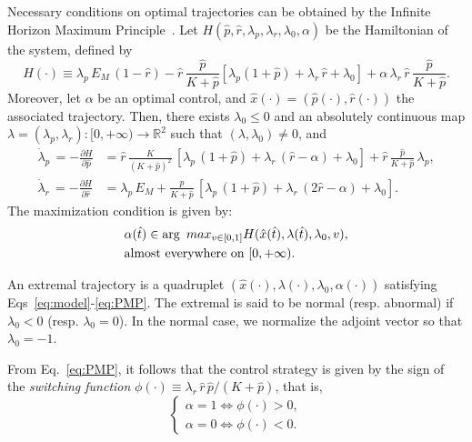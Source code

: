 Necessary conditions on optimal trajectories can be obtained by the Infinite Horizon Maximum Principle~\cite{carlson_infinite_1991}.
Let $H(\hat{p},\hat{r},\lambda_p,\lambda_r,\lambda_0,\alpha)$ be the Hamiltonian of the system, defined by
\[
H(\cdot) \equiv \lambda_p\, E_M\, (1-\hat{r}) - \hat{r}\, \dfrac{\hat{p}}{K+\hat{p}}\left[\lambda_p (1+\hat{p}) +\lambda_r\, \hat{r} +\lambda_0\right] + \alpha \, \lambda_r \, \hat{r}\, \frac{\hat{p}}{K+\hat{p}}.
\]
Moreover, let $\alpha$ be an optimal control, and $\hat{x}(\cdot)=(\hat{p}(\cdot),\hat{r}(\cdot))$ the associated trajectory.
Then, there exists $\lambda_0 \leq 0$ and an absolutely continuous map $\lambda=(\lambda_p,\lambda_r):[0,+\infty) \rightarrow \mathbb{R}^2$
such that $(\lambda,\lambda_0)\neq0$, and
\begin{align}
\dot{\lambda}_p\, =-\frac{\partial H}{\partial \hat p}&= \hat{r} \, \frac{K}{(K+\hat{p})^2}\, \left[\lambda_p \, (1+\hat{p}) +\lambda_r\, ( \hat{r}-\alpha) + \lambda_0\right] + \hat{r}\, \frac{\hat{p}}{K+\hat{p}}\, \lambda_p, \label{eq:adjoint_p}\\
 \dot{\lambda}_r\, =-\frac{\partial H}{\partial \hat r}&= \lambda_p\, E_M +\frac{\hat{p}}{K+\hat{p}} \, \left[\lambda_p \, (1+\hat{p}) +\lambda_r\, (2 \hat{r}-\alpha) +\lambda_0\right] \label{eq:adjoint_r}.
\end{align}
The maximization condition is given by:
\begin{equation}{\label{eq:PMP}}
\begin{aligned}
&\alpha(\hat{t}) \in \arg\ max_{v \in [0,1]} H(\hat{x}(\hat{t}),\lambda(\hat{t}),\lambda_0,v), \\ &\mathrm{almost}\ \mathrm{everywhere}\ \mathrm{on}\ [0,+\infty).
\end{aligned}
\end{equation}

An extremal trajectory is a quadruplet $(\hat{x}(\cdot),\lambda(\cdot),\lambda_0,\alpha(\cdot))$ satisfying Eqs~\ref{eq:model}-\ref{eq:PMP}. The extremal is said to be normal (resp. abnormal) if $\lambda_0<0$ (resp. $\lambda_0=0$). In the normal case, we normalize the adjoint vector so that $\lambda_0=-1$.

From Eq.~\ref{eq:PMP}, it follows that the control strategy is given by the sign of the \textit{switching function} $\phi(\cdot) \equiv \lambda_r \, \hat{r}\, \hat{p}/(K+\hat{p})$, that is,
\[
\begin{cases}
\alpha=1 \iff \phi(\cdot) >0,\\
\alpha=0 \iff \phi(\cdot)<0.
\end{cases}
\]

